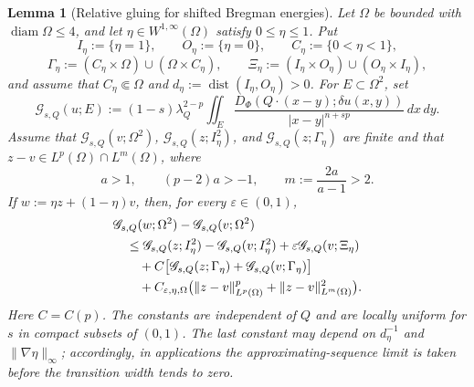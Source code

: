 \documentclass[11pt,reqno]{amsart}
\numberwithin{equation}{section}
\newcommand{\dd}{\,d}
\newtheorem{lemma}[theorem]{Lemma}
\theoremstyle{remark}
\begin{document}
\begin{lemma}[Relative gluing for shifted Bregman energies]
\label{lem:uniform-shifted-bregman-gluing}
Let \(\Omega\) be bounded with \(\operatorname{diam}\Omega\le4\), and let
\(\eta\in W^{1,\infty}(\Omega)\) satisfy \(0\le\eta\le1\).  Put
\[
 I_\eta:=\{\eta=1\},\qquad O_\eta:=\{\eta=0\},\qquad
 C_\eta:=\{0<\eta<1\},
\]
\[
 \Gamma_\eta:=(C_\eta\times\Omega)\cup(\Omega\times C_\eta),
 \qquad
 \Xi_\eta:=(I_\eta\times O_\eta)\cup(O_\eta\times I_\eta),
\]
and assume that \(C_\eta\Subset\Omega\) and
\(d_\eta:=\operatorname{dist}(I_\eta,O_\eta)>0\).
For \(E\subset\Omega^2\), set
\[
 \mathscr G_{s,Q}(u;E):=(1-s)\lambda_Q^{2-p}
 \iint_E\frac{D_\Phi(Q\cdot(x-y);\delta u(x,y))}
 {|x-y|^{n+sp}}\dd x\!\dd y.
\]
Assume that \(\mathscr G_{s,Q}(v;\Omega^2)\),
\(\mathscr G_{s,Q}(z;I_\eta^2)\), and
\(\mathscr G_{s,Q}(z;\Gamma_\eta)\) are finite and that
\(z-v\in L^p(\Omega)\cap L^m(\Omega)\), where
\[
 a>1,\qquad (p-2)a>-1,\qquad m:=\frac{2a}{a-1}>2.
\]
If \(w:=\eta z+(1-\eta)v\), then, for every
\(\varepsilon\in(0,1)\),
\begin{align}
 &\mathscr G_{s,Q}(w;\Omega^2)-\mathscr G_{s,Q}(v;\Omega^2)
 \notag\\
 &\quad\le \mathscr G_{s,Q}(z;I_\eta^2)
       -\mathscr G_{s,Q}(v;I_\eta^2)
       +\varepsilon\mathscr G_{s,Q}(v;\Xi_\eta)\notag\\
 &\qquad+C\bigl[
 \mathscr G_{s,Q}(z;\Gamma_\eta)
 +\mathscr G_{s,Q}(v;\Gamma_\eta)\bigr]\notag\\
 &\qquad+C_{\varepsilon,\eta,\Omega}
 \bigl(\|z-v\|_{L^p(\Omega)}^p
       +\|z-v\|_{L^m(\Omega)}^2\bigr).
 \label{eq:uniform-shifted-bregman-gluing}
\end{align}
Here \(C=C(p)\).  The constants are independent of \(Q\) and are
locally uniform for \(s\) in compact subsets of \((0,1)\).  The last
constant may depend on \(d_\eta^{-1}\) and
\(\|\nabla\eta\|_\infty\); accordingly, in applications the
approximating-sequence limit is taken before the transition width tends
to zero.
\end{lemma}
\end{document}
